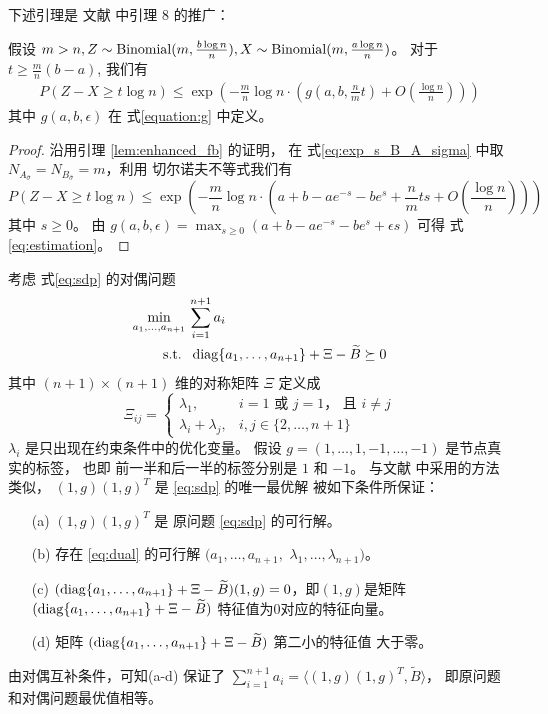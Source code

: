 下述引理是
文献
中引理 8 的推广：
\begin{lemma}\label{lem:zxt}
    假设 $m > n, Z \sim \operatorname{Binomial}(m, \frac{b\log n}{n}), X\sim \operatorname{Binomial}(m, \frac{a\log n}{n})$。
    对于 $ t \geq \frac{m}{n}(b - a)$, 我们有
    \begin{align}\label{eq:estimation}
        P(Z - X \geq t \log n) 
        \leq \exp\left(-\frac{m}{n}\log n \cdot 
        \left( g(a, b, \frac{n}{m}t) + O\left(\frac{\log n}{n} \right)
        \right)
        \right)
    \end{align}
    其中 $g(a,b,\epsilon)$ 在 式\eqref{equation:g} 中定义。
\end{lemma}
\begin{proof}
    沿用引理 \ref{lem:enhanced_fb} 的证明，
在 式\eqref{eq:exp_s_B_A_sigma}
中取  $N_{A_{\bar{\sigma}}}
=N_{B_{\bar{\sigma}}}=m$，利用
切尔诺夫不等式我们有
\begin{equation*}
    P(Z - X \geq t \log n) \leq \exp\left(-\frac{m}{n}\log n \cdot
    \left(a+b-ae^{-s}-be^s+\frac{n}{m}ts + O\left(\frac{\log n}{n} \right)
    \right)
    \right)
\end{equation*}
其中 $s \geq 0$。
由 $g(a,b,\epsilon) = 
\max_{s \geq 0} (a+b-a e^{-s} - b e^s + \epsilon s)$
可得 式 \eqref{eq:estimation}。
\end{proof}
考虑 式\eqref{eq:sdp} 的对偶问题
\begin{align}
    \min_{a_1, \dots, a_{n+1}}\, &\sum_{i=1}^{n+1} a_i \nonumber\\
    \label{eq:dual}
    \textrm{s.t. } &\, \operatorname{diag}\{a_1, \dots, a_{n+1}\} + \Xi - \widetilde{B} \succeq 0
\end{align}
其中 $(n+1)\times (n+1)$ 维的对称矩阵
$\Xi$ 定义成 
\begin{equation}
    \Xi_{ij} = \begin{cases}
        \lambda_1, & i=1\text{ 或 }j=1 \text{， 且 }i\ne j\\
        \lambda_i + \lambda_j, & i, j\in\{2,\ldots,n+1\}
    \end{cases}
\end{equation}
$\lambda_i$ 是只出现在约束条件中的优化变量。
假设 $g=(1,\ldots,1,-1,\ldots,-1)$ 是节点真实的标签，
也即
前一半和后一半的标签分别是  $1$ 和 $-1$。
与文献  中采用的方法类似，
$(1,g)(1,g)^T$ 是 \eqref{eq:sdp} 的唯一最优解
 被如下条件所保证：
\begin{enumerate}
    \item[(a)] $(1,g)(1,g)^T$ 是 原问题 \eqref{eq:sdp} 的可行解。
    \item[(b)] 存在 \eqref{eq:dual} 的可行解 $(a_1,\ldots,a_{n+1},$ $\lambda_1,\ldots,\lambda_{n+1})$。
    \item[(c)] $(\operatorname{diag}\{a_1, \dots, a_{n+1}\} + \Xi - \widetilde{B})(1,g)=0$，即$(1,g)$是矩阵 $(\operatorname{diag}\{a_1, \dots, a_{n+1}\} + \Xi - \widetilde{B})$ 特征值为0对应的特征向量。
    \item[(d)]  矩阵 $(\operatorname{diag}\{a_1, \dots, a_{n+1}\} + \Xi - \widetilde{B})$ 第二小的特征值 大于零。 
\end{enumerate}
由对偶互补条件，可知(a-d) 保证了 
$\sum_{i=1}^{n+1} a_i=\langle(1,g)(1,g)^T,\widetilde{B} \rangle$，
即原问题和对偶问题最优值相等。

